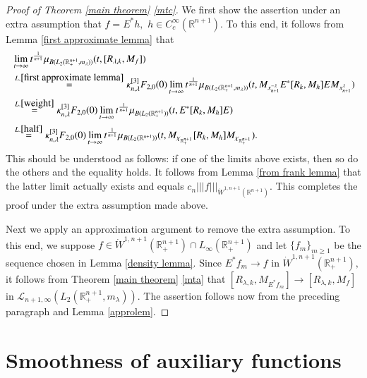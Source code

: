 \documentclass{amsart}
\begin{document}
\begin{proof}[Proof of Theorem \ref{main theorem} \eqref{mtc}]
We first show the assertion under an extra assumption that $f=E^{\ast}h,$ $h\in C_c^\infty(\mathbb{R}^{n+1}).$ To this end, it follows from Lemma \ref{first approximate lemma} that
\begin{align}\label{spectralasym1}
&\lim_{t\to\infty}t^{\frac1{n+1}}\mu_{B(L_2(\mathbb{R}^{n+1}_+,m_{\lambda}))}(t,[R_{\lambda,k},M_f])\nonumber\\
&\stackrel{L.\ref{first approximate lemma}}{=}\kappa_{n,\lambda}^{[3]}F_{2,0}(0)\lim_{t\to\infty}t^{\frac1{n+1}}\mu_{B(L_2(\mathbb{R}^{n+1}_+,m_{\lambda}))}(t, M_{x_{n+1}^{-\lambda}} E^{\ast}[R_k,M_h]E M_{x_{n+1}^{\lambda}})\nonumber\\
&\stackrel{L.\ref{weight}}{=}\kappa_{n,\lambda}^{[3]}F_{2,0}(0)\lim_{t\to\infty}t^{\frac1{n+1}}\mu_{B(L_2(\mathbb{R}^{n+1}_+))}(t, E^{\ast}[R_k,M_h]E )\nonumber\\
&\stackrel{L.\ref{half}}{=}\kappa_{n,\lambda}^{[3]}F_{2,0}(0)\lim_{t\to\infty}t^{\frac1{n+1}}\mu_{B(L_2(\mathbb{R}^{n+1}))}(t, M_{\chi_{\mathbb{R}^{n+1}_+}}[R_k,M_h]M_{\chi_{\mathbb{R}^{n+1}_+}}).
\end{align}
This should be understood as follows: if one of the limits above exists, then so do the others and the equality holds. It follows from Lemma \ref{from frank lemma} that the latter limit actually exists and equals $c_n|||f|||_{\dot{W}^{1,n+1}(\mathbb{R}^{n+1})}.$ This completes the proof under the extra assumption made above.

Next we apply an approximation argument to remove the extra assumption. To this end, we suppose $f\in  \dot{W}^{1,n+1}(\mathbb{R}_+^{n+1})\cap L_{\infty}(\mathbb{R}_+^{n+1})$ and let $\{f_m\}_{m\geq 1}$ be the sequence chosen in Lemma \ref{density lemma}. Since $E^{\ast}f_m\to f$ in $\dot{W}^{1,n+1}(\mathbb{R}^{n+1}_+),$ it follows from Theorem \ref{main theorem} \eqref{mta} that
$[R_{\lambda,k},M_{E^{\ast}f_m}]\rightarrow [R_{\lambda,k},M_f]$ in $\mathcal{L}_{n+1,\infty}(L_2(\mathbb{R}^{n+1}_+,m_{\lambda})).$ The assertion follows now from the preceding paragraph and Lemma \ref{approlem}.
\end{proof}

\appendix


\section{Smoothness of auxiliary functions}
\setcounter{equation}{0}
\end{document}
